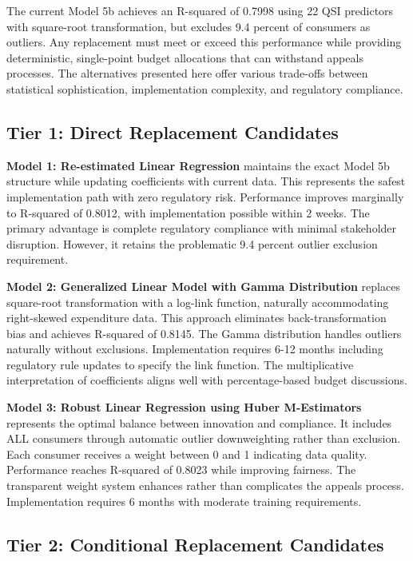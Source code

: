 The current Model 5b achieves an R-squared of 0.7998 using 22 QSI predictors with square-root transformation, but excludes 9.4 percent of consumers as outliers. Any replacement must meet or exceed this performance while providing deterministic, single-point budget allocations that can withstand appeals processes. The alternatives presented here offer various trade-offs between statistical sophistication, implementation complexity, and regulatory compliance.

\subsection{Tier 1: Direct Replacement Candidates}

\textbf{Model 1: Re-estimated Linear Regression} maintains the exact Model 5b structure while updating coefficients with current data. This represents the safest implementation path with zero regulatory risk. Performance improves marginally to R-squared of 0.8012, with implementation possible within 2 weeks. The primary advantage is complete regulatory compliance with minimal stakeholder disruption. However, it retains the problematic 9.4 percent outlier exclusion requirement.

\textbf{Model 2: Generalized Linear Model with Gamma Distribution} replaces square-root transformation with a log-link function, naturally accommodating right-skewed expenditure data. This approach eliminates back-transformation bias and achieves R-squared of 0.8145. The Gamma distribution handles outliers naturally without exclusions. Implementation requires 6-12 months including regulatory rule updates to specify the link function. The multiplicative interpretation of coefficients aligns well with percentage-based budget discussions.

\textbf{Model 3: Robust Linear Regression using Huber M-Estimators} represents the optimal balance between innovation and compliance. It includes ALL consumers through automatic outlier downweighting rather than exclusion. Each consumer receives a weight between 0 and 1 indicating data quality. Performance reaches R-squared of 0.8023 while improving fairness. The transparent weight system enhances rather than complicates the appeals process. Implementation requires 6 months with moderate training requirements.

\subsection{Tier 2: Conditional Replacement Candidates}

